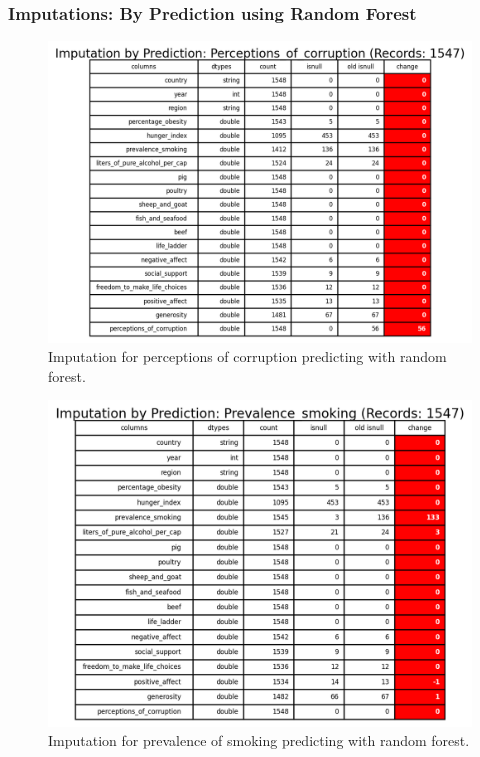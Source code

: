             \subsubsection{Imputations: By Prediction using Random Forest}
                \begin{figure}[H]
                        \centering
                        \includegraphics[scale=1]{images/dp_imput_perceptions_of_corruption}
                        \caption{Imputation for perceptions of corruption predicting with random forest.}
                        \label{fig:dp-imput-perception-corruption}
                \end{figure}
                \begin{figure}[H]
                        \centering
                        \includegraphics[scale=1]{images/dp_imput_prevalence_smoking}
                        \caption{Imputation for prevalence of smoking predicting with random forest.}
                        \label{fig:dp-imput-prevalence-of-smoking}
                \end{figure}
